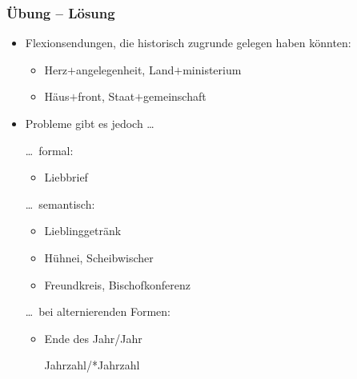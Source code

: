 
\begin{frame}
\frametitle{Übung -- Lösung}

\begin{itemize}
	\item Flexionsendungen, die historisch zugrunde gelegen haben könnten:
	
	\begin{itemize}
		\settowidth{}
		
		\item Herz$+$angelegenheit, Land$+$ministerium 

		\item Häus$+$front, Staat$+$gemeinschaft \jambox{[Plural]}
	\end{itemize}

\pause 
	
	\item Probleme gibt es jedoch \dots
	
	
		\dots\ formal:
		
		\begin{itemize}
		\item Liebbrief 
		
		\end{itemize}
		\dots\ semantisch:
		
		\begin{itemize}
		\item Lieblinggetränk 
		
		\item Hühnei, Scheibwischer 
	
		\item Freundkreis, Bischofkonferenz 
		
		\end{itemize}
		\dots\ bei alternierenden Formen:
		
		\begin{itemize}
		\item Ende des Jahr/Jahr \jambox{[Genitivalternation]}	
		
			\vs Jahrzahl/*Jahrzahl 
\end{itemize}
\end{itemize}

\end{frame}